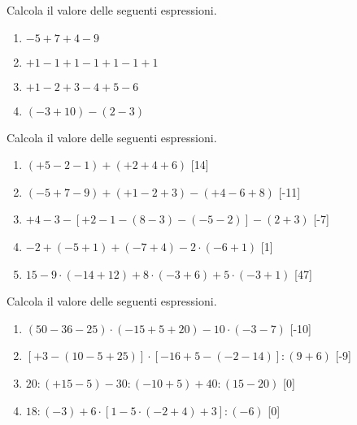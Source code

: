 \begin{esercizio}
Calcola il valore delle seguenti espressioni.
 \begin{multicols}{2}
 \begin{enumerate}[noitemsep, label=(\alph*)]
 \item \(-5+7+4-9\)
 \item \(+1-1+1-1+1-1+1\)
 \item \(+1-2+3-4+5-6\)
 \item \((-3+10)-(2-3)\)
 \end{enumerate}
 \end{multicols}
\end{esercizio}

\begin{esercizio} %
Calcola il valore delle seguenti espressioni.
 \begin{enumerate}[noitemsep, label=(\alph*)]
 \item \((+5-2-1)+(+2+4+6)\) \hfill[14]
 \item \((-5+7-9)+(+1-2+3)-(+4-6+8)\) \hfill[-11]
 \item \(+4-3-[+2-1-(8-3)-(-5-2)]-(2+3)\) \hfill[-7]
 \item \(-2+(-5+1)+(-7+4)-2 \cdot (-6+1)\) \hfill[1]
 \item \(15-9 \cdot (-14+12)+8 \cdot (-3+6)+ 5 \cdot(-3+1)\) \hfill[47]
 \end{enumerate}
\end{esercizio}

\begin{esercizio} %
Calcola il valore delle seguenti espressioni.
 \begin{enumerate}[noitemsep, label=(\alph*)]
 \item \((50-36-25)\cdot (-15+5+20)-10\cdot (-3-7)\) \hfill[-10]
 \item \([+3-(10-5+25)]\cdot [-16+5-(-2-14)]:(9+6)\) \hfill[-9]
 \item \(20:(+15-5)-30:(-10+5)+40:(15-20)\) \hfill[0]
 \item \(18:(-3)+6\cdot [1-5\cdot (-2+4)+3]: (-6)\) \hfill[0]
\end{enumerate}
\end{esercizio}

